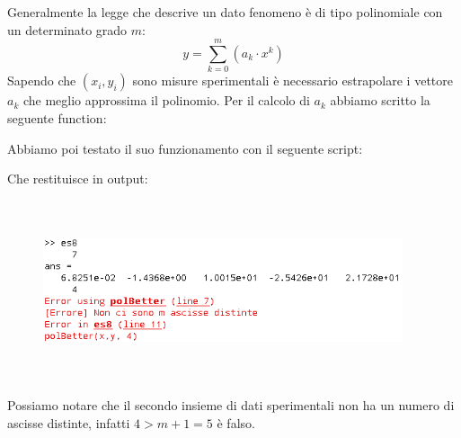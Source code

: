 \begin{flushleft}
Generalmente la legge che descrive un dato fenomeno è di tipo polinomiale con un determinato grado $m$:
\[
y = \sum_{k=0}^{m}(a_k\cdot x^k)
\]
Sapendo che $(x_i,y_i)$ sono misure sperimentali è necessario estrapolare i vettore $a_k$ che meglio approssima il polinomio. Per il calcolo di $a_k$ abbiamo scritto la seguente function:

Abbiamo poi testato il suo funzionamento con il seguente script:

Che restituisce in output:
\begin{figure}[H]
\includegraphics[left, width=400px, height=200px]{cap_4/es8/es48.png}
\end{figure}
Possiamo notare che il secondo insieme di dati sperimentali non ha un numero di ascisse distinte, infatti $4>m+1=5$ è falso.
\end{flushleft}